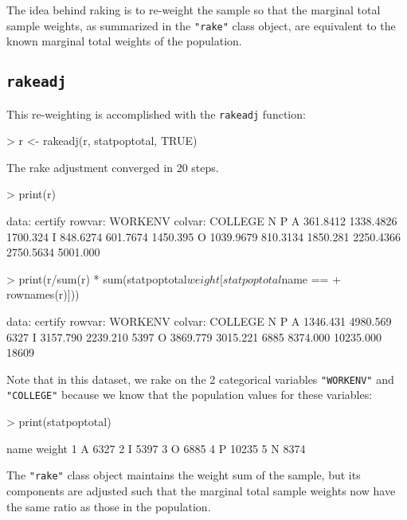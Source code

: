 \documentclass[12pt]{TDH-article}
\begin{document}
The idea behind raking is to re-weight the sample so that the marginal total sample weights, as summarized in the {\tt "rake"} class object, are equivalent to the known marginal total weights of the population.

\subsection{{\tt rakeadj}}
This re-weighting is accomplished with the {\tt rakeadj} function:

\begin{Schunk}
\begin{Sinput}
> r <- rakeadj(r, statpoptotal, TRUE)
\end{Sinput}
\begin{Soutput}
The rake adjustment converged in 20 steps.
\end{Soutput}
\begin{Sinput}
> print(r)
\end{Sinput}
\begin{Soutput}
  data: certify
rowvar: WORKENV
colvar: COLLEGE
          N         P         
A  361.8412 1338.4826 1700.324
I  848.6274  601.7674 1450.395
O 1039.9679  810.3134 1850.281
  2250.4366 2750.5634 5001.000
\end{Soutput}
\begin{Sinput}
> print(r/sum(r) * sum(statpoptotal$weight[statpoptotal$name == 
+     rownames(r)]))
\end{Sinput}
\begin{Soutput}
  data: certify
rowvar: WORKENV
colvar: COLLEGE
         N         P      
A 1346.431  4980.569  6327
I 3157.790  2239.210  5397
O 3869.779  3015.221  6885
  8374.000 10235.000 18609
\end{Soutput}
\end{Schunk}

Note that in this dataset, we rake on the 2 categorical variables {\tt "WORKENV"} and {\tt "COLLEGE"} because we know that the population values for these variables:

\begin{Schunk}
\begin{Sinput}
> print(statpoptotal)
\end{Sinput}
\begin{Soutput}
  name weight
1    A   6327
2    I   5397
3    O   6885
4    P  10235
5    N   8374
\end{Soutput}
\end{Schunk}

The {\tt "rake"} class object maintains the weight sum of the sample, but its components are adjusted such that the marginal total sample weights now have the same ratio as those in the population.
\end{document}
